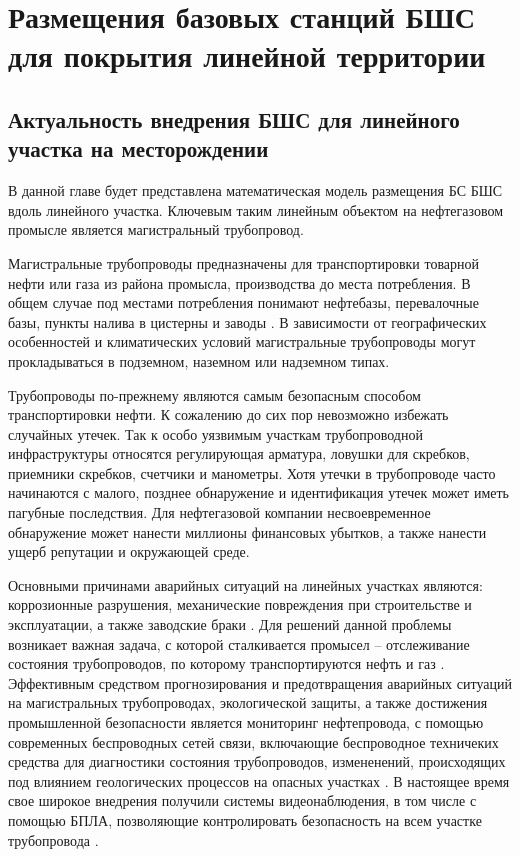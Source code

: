 \chapter{Размещения базовых станций БШС для покрытия линейной территории}\label{chapter_linear_network}
\section{Актуальность внедрения БШС для линейного участка на месторождении}

В данной главе будет представлена математическая модель размещения БС БШС вдоль линейного участка. Ключевым таким линейным объектом на нефтегазовом промысле является магистральный трубопровод. 

Магистральные трубопроводы предназначены для транспортировки товарной нефти или газа из района промысла, производства до места потребления. В общем случае под местами потребления понимают нефтебазы, перевалочные базы, пункты налива в цистерны и заводы \cite{Deineko2018}. В зависимости от географических особенностей и климатических условий магистральные трубопроводы могут прокладываться в подземном, наземном или надземном типах.

Трубопроводы по-прежнему являются самым безопасным способом транспортировки нефти. К сожалению до сих пор  невозможно избежать случайных утечек.  Так к особо уязвимым участкам трубопроводной инфраструктуры относятся регулирующая арматура, ловушки для скребков, приемники скребков, счетчики и манометры.
Хотя утечки в трубопроводе часто начинаются с малого, позднее обнаружение и идентификация утечек может иметь пагубные последствия. Для нефтегазовой компании несвоевременное обнаружение может нанести миллионы финансовых убытков, а также нанести ущерб репутации и окружающей среде.

Основными причинами аварийных ситуаций на линейных участках являются: коррозионные разрушения, механические повреждения при строительстве и эксплуатации, а также заводские браки \cite{Deineko2018_alone}. Для решений данной проблемы возникает важная задача, с которой сталкивается промысел -- отслеживание состояния трубопроводов, по которому транспортируются нефть и газ \cite{Aalsalem2018}. Эффективным средством прогнозирования и предотвращения аварийных ситуаций на магистральных трубопроводах, экологической защиты, а также  достижения промышленной безопасности является мониторинг нефтепровода, с помощью современных беспроводных сетей связи, включающие беспроводное техничеких средства для диагностики состояния трубопроводов, измененений, происходящих под влиянием геологических процессов на опасных участках \cite{Krzyszton2021,Mehmood2016, Lin2019, Adegboye2019}. В настоящее время свое широкое внедрения получили системы видеонаблюдения, в том числе с помощью БПЛА, позволяющие контролировать безопасность на всем участке трубопровода \cite{Fedorova2020, Aljuaid2020, Adegboye2019, Gomez2017, Fawzi2019}.


